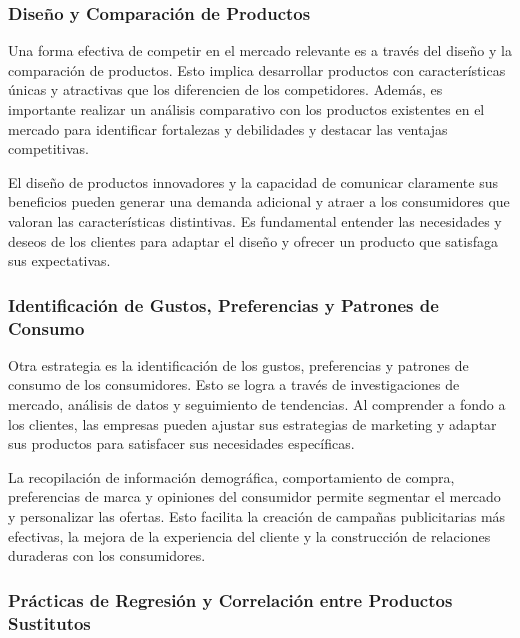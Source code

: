 \documentclass[
  doc,
  floatsintext,
  longtable,
  a4paper,
  nolmodern,
  notxfonts,
  notimes,
  12pt,
  colorlinks=true,linkcolor=blue,citecolor=blue,urlcolor=blue]{apa7}
\begin{document}
\subsubsection{Diseño y Comparación de
Productos}\label{diseuxf1o-y-comparaciuxf3n-de-productos}

Una forma efectiva de competir en el mercado relevante es a través del
diseño y la comparación de productos. Esto implica desarrollar productos
con características únicas y atractivas que los diferencien de los
competidores. Además, es importante realizar un análisis comparativo con
los productos existentes en el mercado para identificar fortalezas y
debilidades y destacar las ventajas competitivas.

El diseño de productos innovadores y la capacidad de comunicar
claramente sus beneficios pueden generar una demanda adicional y atraer
a los consumidores que valoran las características distintivas. Es
fundamental entender las necesidades y deseos de los clientes para
adaptar el diseño y ofrecer un producto que satisfaga sus expectativas.

\subsubsection{Identificación de Gustos, Preferencias y Patrones de
Consumo}\label{identificaciuxf3n-de-gustos-preferencias-y-patrones-de-consumo}

Otra estrategia es la identificación de los gustos, preferencias y
patrones de consumo de los consumidores. Esto se logra a través de
investigaciones de mercado, análisis de datos y seguimiento de
tendencias. Al comprender a fondo a los clientes, las empresas pueden
ajustar sus estrategias de marketing y adaptar sus productos para
satisfacer sus necesidades específicas.

La recopilación de información demográfica, comportamiento de compra,
preferencias de marca y opiniones del consumidor permite segmentar el
mercado y personalizar las ofertas. Esto facilita la creación de
campañas publicitarias más efectivas, la mejora de la experiencia del
cliente y la construcción de relaciones duraderas con los consumidores.

\subsubsection{Prácticas de Regresión y Correlación entre Productos
Sustitutos}\label{pruxe1cticas-de-regresiuxf3n-y-correlaciuxf3n-entre-productos-sustitutos}
\end{document}
